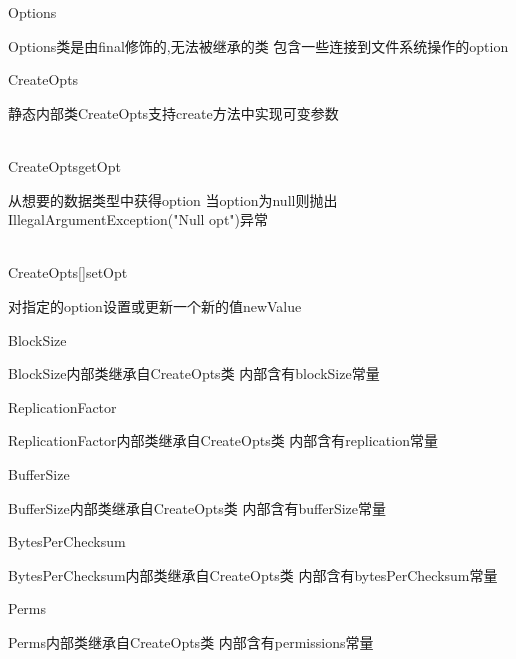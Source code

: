 \begin{XeClass}{Options}
   
 Options类是由final修饰的,无法被继承的类
 包含一些连接到文件系统操作的option

  \begin{XeInnerClass}{CreateOpts}
     
 静态内部类CreateOpts支持create方法中实现可变参数

    \begin{XeMethod}{\XeProtected\\ }{CreateOpts}{getOpt}
         
 从想要的数据类型中获得option
 当option为null则抛出IllegalArgumentException("Null opt")异常

    \end{XeMethod}

    \begin{XeMethod}{\XeProtected\\ }{CreateOpts[]}{setOpt}
         
 对指定的option设置或更新一个新的值newValue

    \end{XeMethod}

    \begin{XeInnerClass}{BlockSize}
       
 BlockSize内部类继承自CreateOpts类
 内部含有blockSize常量

    \end{XeInnerClass}
    \begin{XeInnerClass}{ReplicationFactor}
       
 ReplicationFactor内部类继承自CreateOpts类
 内部含有replication常量

    \end{XeInnerClass}
    \begin{XeInnerClass}{BufferSize}
       
 BufferSize内部类继承自CreateOpts类
 内部含有bufferSize常量

    \end{XeInnerClass}
    \begin{XeInnerClass}{BytesPerChecksum}
       
 BytesPerChecksum内部类继承自CreateOpts类
 内部含有bytesPerChecksum常量

    \end{XeInnerClass}
    \begin{XeInnerClass}{Perms}
       
 Perms内部类继承自CreateOpts类
 内部含有permissions常量


\end{XeInnerClass}
\end{XeInnerClass}
\end{XeClass}
